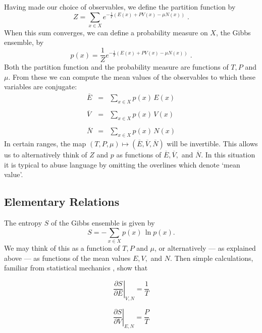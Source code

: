 \documentclass{article}
\begin{document}
Having made our choice of observables, we define the partition function
by 
\[     Z = \sum_{x \in X} e^{-\frac{1}{T}(E(x) + P V(x) - \mu N(x))} \; .\]
When this sum converges, we can define a probability measure on $X$,
the Gibbs ensemble, by
\[    p(x) = \frac{1}{Z} e^{-\frac{1}{T}(E(x) + P V(x) - \mu N(x))} \; .\]
Both the partition function and the probability measure are
functions of $T, P$ and $\mu$.  From these we can compute the mean
values of the observables to which these variables are conjugate:
\[
\begin{array}{ccc} 
    \overline{E} &=& \displaystyle{\sum_{x \in X}} p(x) \, E(x)   \\
                                                   \\
    \overline{V} &=& \displaystyle{\sum_{x \in X}} p(x) \, V(x)   \\
                                                   \\
    \overline{N} &=& \displaystyle{\sum_{x \in X}} p(x) \, N(x)   
\end{array}
\]
In certain ranges, the map $(T,P,\mu) \mapsto (\overline{E},
\overline{V}, \overline{N})$ will be invertible.  This allows us to
alternatively think of $Z$ and $p$ as 
functions of $\overline{E}, \overline{V},$ and $\overline{N}$.
In this situation it is typical to abuse language by omitting the
overlines which denote `mean value'.

\subsection{Elementary Relations} \label{elementary}

The entropy $S$ of the Gibbs ensemble is given by
\[      S = - \sum_{x \in X} p(x)\, \ln p(x) .\]
We may think of this as a function of $T, P$ and $\mu$, or 
alternatively --- as explained above --- as functions of 
the mean values $E, V,$ and $N$.  Then simple calculations,
familiar from statistical mechanics \cite{Reif}, show that

\begin{equation}
\label{derivative1}
\displaystyle{\left.\frac{\partial S}{\partial E}\right|_{V,N}}  =
\displaystyle{\frac{1}{T}} 
\end{equation}

\begin{equation}
\label{derivative2}
\displaystyle{\left.\frac{\partial S}{\partial V}\right|_{E,N}}  =
\displaystyle{\frac{P}{T}} 
\end{equation}
\end{document}
